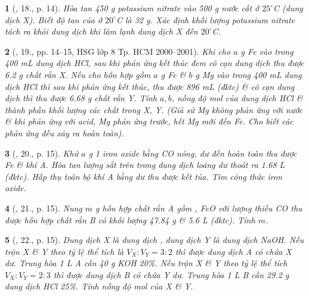 \documentclass{article}
\newtheorem{baitoan}{}
\begin{document}
\begin{baitoan}[\cite{An_400_BT_Hoa_Hoc_9}, 18., p. 14]
	Hòa tan {\rm450 g} potassium nitrate vào {\rm500 g} nước cất ở $25^\circ${\rm C} (dung dịch X). Biết độ tan của {\rm{}} ở $20^\circ${\rm C} là {\rm32 g}. Xác định khối lượng potassium nitrate tách ra khỏi dung dịch khi làm lạnh dung dịch X đến $20^\circ${\rm C}.
\end{baitoan}

\begin{baitoan}[\cite{An_400_BT_Hoa_Hoc_9}, 19., pp. 14--15, HSG lớp 8 Tp. HCM 2000--2001]
	Khi cho $a$ {\rm g Fe} vào trong {\rm400 mL} dung dịch {\rm HCl}, sau khi phản ứng kết thúc đem cô cạn dung dịch thu được {\rm6.2 g} chất rắn X. Nếu cho hỗn hợp gồm $a$ {\rm g Fe} \& $b$ {\rm g Mg} vào trong {\rm400 mL} dung dịch {\rm HCl} thì sau khi phản ứng kết thúc, thu được {\rm896 mL } (đktc) \& cô cạn dung dịch thì thu được {\rm6.68 g} chất rắn Y. Tính $a,b$, nồng độ mol của dung dịch {\rm HCl} \& thành phần khối lượng các chất trong X, Y. (Giả sử {\rm Mg} không phản ứng với nước \& khi phản ứng với acid, {\rm Mg} phản ứng trước, hết {\rm Mg} mới đến {\rm Fe}. Cho biết các phản ứng đều xảy ra hoàn toàn).
\end{baitoan}

\begin{baitoan}[\cite{An_400_BT_Hoa_Hoc_9}, 20., p. 15]
	Khử $a$ {\rm g} 1 iron oxide bằng {\rm CO} nóng, dư đến hoàn toàn thu được {\rm Fe} \& khí A. Hòa tan lượng sắt trên trong dung dịch {\rm{}} loãng dư thoát ra {\rm1.68 L } (đktc). Hấp thụ toàn bộ khí A bằng {\rm{}} dư thu được kết tủa. Tìm công thức iron oxide.
\end{baitoan}

\begin{baitoan}[\cite{An_400_BT_Hoa_Hoc_9}, 21., p. 15]
	Nung $m$ {\rm g} hỗn hợp chất rắn A gồm {\rm{}, FeO} với lượng thiếu {\rm CO} thu được hỗn hợp chất rắn B có khối lượng {\rm47.84 g} \& {\rm5.6 L } (đktc). Tính $m$.
\end{baitoan}

\begin{baitoan}[\cite{An_400_BT_Hoa_Hoc_9}, 22., p. 15]
	Dung dịch X là dung dịch {\rm{}}, dung dịch Y là dung dịch {\rm NaOH}. Nếu trộn X \& Y theo tỷ lệ thể tích là $V_X:V_Y = 3:2$ thì được dung dịch A có chứa X dư. Trung hòa {\rm1 L} A cần {\rm40 g KOH 20\%}. Nếu trộn X \& Y theo tỷ lệ thể tích $V_X:V_Y = 2:3$ thì được dung dịch B có chứa Y dư. Trung hòa {\rm1 L} B cần {\rm29.2 g} dung dịch {\rm HCl 25\%}. Tính nồng độ mol của X \& Y.
\end{baitoan}
\end{document}
